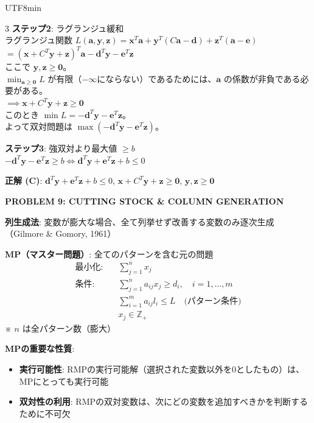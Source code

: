 \documentclass[8pt,a4paper]{article}
\newcommand{\mysection}[1]{\vspace{2pt}\textbf{#1}\vspace{1pt}}
\begin{document}
\begin{CJK}{UTF8}{min}
\begin{multicols}{3}
\textbf{ステップ2}: ラグランジュ緩和\\
ラグランジュ関数 $L(\boldsymbol{a}, \boldsymbol{y}, \boldsymbol{z}) = \boldsymbol{x}^T \boldsymbol{a} + \boldsymbol{y}^T (C\boldsymbol{a} - \boldsymbol{d}) + \boldsymbol{z}^T (\boldsymbol{a} - \boldsymbol{e})$\\
$= (\boldsymbol{x} + C^T \boldsymbol{y} + \boldsymbol{z})^T \boldsymbol{a} - \boldsymbol{d}^T \boldsymbol{y} - \boldsymbol{e}^T \boldsymbol{z}$\\
ここで $\boldsymbol{y}, \boldsymbol{z} \geq \mathbf{0}$。\\
$\min_{\boldsymbol{a} \geq \mathbf{0}} L$ が有限（$-\infty$にならない）であるためには、$\boldsymbol{a}$ の係数が非負である必要がある。\\
$\implies \boldsymbol{x} + C^T \boldsymbol{y} + \boldsymbol{z} \geq \mathbf{0}$\\
このとき $\min L = -\boldsymbol{d}^T \boldsymbol{y} - \boldsymbol{e}^T \boldsymbol{z}$。\\
よって双対問題は $\max (-\boldsymbol{d}^T \boldsymbol{y} - \boldsymbol{e}^T \boldsymbol{z})$。

\textbf{ステップ3}: 強双対より最大値 $\geq b$\\
$-\boldsymbol{d}^T \boldsymbol{y} - \boldsymbol{e}^T \boldsymbol{z} \geq b \iff \boldsymbol{d}^T \boldsymbol{y} + \boldsymbol{e}^T \boldsymbol{z} + b \leq 0$

\textbf{正解 (C)}: $\boldsymbol{d}^T \boldsymbol{y} + \boldsymbol{e}^T \boldsymbol{z} + b \leq 0$, $\boldsymbol{x} + C^T \boldsymbol{y} + \boldsymbol{z} \geq \mathbf{0}$, $\boldsymbol{y}, \boldsymbol{z} \geq \mathbf{0}$

\mysection{PROBLEM 9: CUTTING STOCK \& COLUMN GENERATION}

\textbf{列生成法}: 変数が膨大な場合、全て列挙せず改善する変数のみ逐次生成（Gilmore \& Gomory, 1961）

\textbf{MP（マスター問題）}: 全てのパターンを含む元の問題
\begin{align*}
\text{最小化:} \quad & \sum_{j=1}^n x_j \\
\text{条件:} \quad & \sum_{j=1}^n a_{ij} x_j \geq d_i, \quad i = 1, \ldots, m \\
& \sum_{i=1}^m a_{ij} l_i \leq L \quad \text{(パターン条件)} \\
& x_j \in \mathbb{Z}_+
\end{align*}
※ $n$ は全パターン数（膨大）

\textbf{MPの重要な性質}:
\begin{itemize}
    \item \textbf{実行可能性}: RMPの実行可能解（選択された変数以外を0としたもの）は、MPにとっても実行可能
    \item \textbf{双対性の利用}: RMPの双対変数は、次にどの変数を追加すべきかを判断するために不可欠
\end{itemize}


\end{multicols}
\end{CJK}
\end{document}
